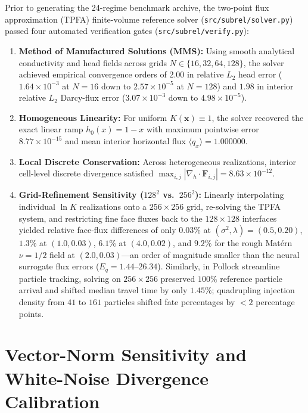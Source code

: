 \documentclass[preprint,12pt,authoryear]{elsarticle}
\begin{document}
Prior to generating the 24-regime benchmark archive, the two-point flux approximation (TPFA) finite-volume reference solver (\texttt{src/subrel/solver.py}) passed four automated verification gates (\texttt{src/subrel/verify.py}):
\begin{enumerate}
  \item \textbf{Method of Manufactured Solutions (MMS):} Using smooth analytical conductivity and head fields across grids $N \in \{16, 32, 64, 128\}$, the solver achieved empirical convergence orders of $2.00$ in relative $L_2$ head error ($1.64 \times 10^{-3}$ at $N=16$ down to $2.57 \times 10^{-5}$ at $N=128$) and $1.98$ in interior relative $L_2$ Darcy-flux error ($3.07 \times 10^{-3}$ down to $4.98 \times 10^{-5}$).
  \item \textbf{Homogeneous Linearity:} For uniform $K(\mathbf{x}) \equiv 1$, the solver recovered the exact linear ramp $h_0(x) = 1 - x$ with maximum pointwise error $8.77 \times 10^{-15}$ and mean interior horizontal flux $\langle q_x \rangle = 1.000000$.
  \item \textbf{Local Discrete Conservation:} Across heterogeneous realizations, interior cell-level discrete divergence satisfied $\max_{i,j} |\nabla_h \cdot \mathbf{F}_{i,j}| = 8.63 \times 10^{-12}$.
  \item \textbf{Grid-Refinement Sensitivity ($128^2$ vs.\ $256^2$):} Linearly interpolating individual $\ln K$ realizations onto a $256 \times 256$ grid, re-solving the TPFA system, and restricting fine face fluxes back to the $128 \times 128$ interfaces yielded relative face-flux differences of only $0.03\%$ at $(\sigma^2, \lambda) = (0.5, 0.20)$, $1.3\%$ at $(1.0, 0.03)$, $6.1\%$ at $(4.0, 0.02)$, and $9.2\%$ for the rough Mat\'{e}rn $\nu = 1/2$ field at $(2.0, 0.03)$---an order of magnitude smaller than the neural surrogate flux errors ($E_q = 1.44$--$26.34$). Similarly, in Pollock streamline particle tracking, solving on $256 \times 256$ preserved $100\%$ reference particle arrival and shifted median travel time by only $1.45\%$; quadrupling injection density from $41$ to $161$ particles shifted fate percentages by $< 2$ percentage points.
\end{enumerate}

\section{Vector-Norm Sensitivity and White-Noise Divergence Calibration}
\label{sec:s2}
\end{document}
